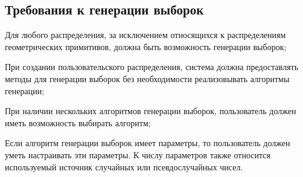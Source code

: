 \subsection{Требования к генерации выборок}
\begin{itemizecmp}
    \item Для любого распределения, за исключением относящихся к распределениям геометрических примитивов, должна быть возможность генерации выборок;
    \item При создании пользовательского распределения, система должна предоставлять методы для генерации выборок без необходимости реализовывать алгоритмы генерации;
    \item При наличии нескольких алгоритмов генерации выборок, пользователь должен иметь возможность выбирать алгоритм;
    \item Если алгоритм генерации выборок имеет параметры, то пользователь должен уметь настраивать эти параметры. К числу параметров также относится используемый источник случайных или псевдослучайных чисел.
\end{itemizecmp}

